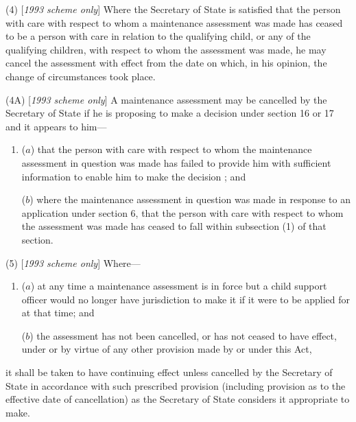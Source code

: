 \documentclass[12pt,a4paper]{article}
\begin{document}
(4) [\emph{1993 scheme only}] Where 
the Secretary of State  %
is satisfied that the person with care with respect to whom a maintenance assessment was made has ceased to be a person with care in relation to the qualifying child, or any of the qualifying children, with respect to whom the assessment was made, he may cancel the assessment with effect from the date on which, in his opinion, the change of circumstances took place.

(4A) [\emph{1993 scheme only}] A maintenance assessment may be cancelled by 
the Secretary of State  %
if he is 
proposing to make a decision under section 16 or 17  %
and it appears to him—
\begin{enumerate}\item[]
($a$) that the person with care with respect to whom the maintenance assessment in question was made has failed to provide him with sufficient information to enable him to 
make the decision%
; and

($b$) where the maintenance assessment in question was made in response to an application under section 6, that the person with care with respect to whom the assessment was made has ceased to fall within subsection (1) of that section.
\end{enumerate}

(5) [\emph{1993 scheme only}] Where—
\begin{enumerate}\item[]
($a$) at any time a maintenance assessment is in force but a child support officer would no longer have jurisdiction to make it if it were to be applied for at that time; and

($b$) the assessment has not been cancelled, or has not ceased to have effect, under or by virtue of any other provision made by or under this Act,
\end{enumerate}
it shall be taken to have continuing effect unless cancelled by 
the Secretary of State  %
in accordance with such prescribed provision (including provision as to the effective date of cancellation) as the Secretary of State considers it appropriate to make.
\end{document}
